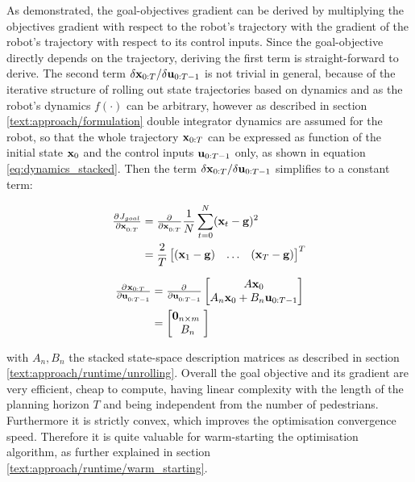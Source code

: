 As demonstrated, the goal-objectives gradient can be derived by multiplying the objectives gradient with respect to the robot's trajectory with the gradient of the robot's trajectory with respect to its control inputs. Since the goal-objective directly depends on the trajectory, deriving the first term is straight-forward to derive. The second term $\delta \mathbf{x}_{0:T} / \delta \mathbf{u}_{0:T-1}$ is not trivial in general, because of the iterative structure of rolling out state trajectories based on dynamics and as the robot's dynamics $f(\cdot)$ can be arbitrary, however as described in section \ref{text:approach/formulation} double integrator dynamics are assumed for the robot, so that the whole trajectory $\mathbf{x}_{0:T}$ can be expressed as function of the initial state $\mathbf{x}_0$ and the control inputs $\mathbf{u}_{0:T-1}$ only, as shown in equation \ref{eq:dynamics_stacked}. Then the term $\delta \mathbf{x}_{0:T} / \delta \mathbf{u}_{0:T-1}$ simplifies to a constant term:

\begin{align}
\pd{J_{goal}}{\x_{0:T}} &= \pd{}{\x_{0:T}} \frac{1}{N} \sum_{t = 0}^N (\x_t - \mathbf{g})^2 \\
&= \frac{2}{T} \begin{bmatrix} (\x_1 - \mathbf{g}) & \hdots & (\x_T - \mathbf{g}) \end{bmatrix}^T
\end{align}

\begin{align}
\pd{\x_{0:T}}{\u_{0:T-1}} &= \pd{}{\u_{0:T-1}} \begin{bmatrix} A \x_0 \\ A_n \x_0 + B_n \u_{0:T-1} \end{bmatrix} \\
&= \begin{bmatrix} \mathbf{0}_{n \times m} \\ B_n \end{bmatrix}
\end{align}

with $A_n, B_n$ the stacked state-space description matrices as described in section \ref{text:approach/runtime/unrolling}. 
\newline
Overall the goal objective and its gradient are very efficient, cheap to compute, having linear complexity with the length of the planning horizon $T$ and being independent from the number of pedestrians. Furthermore it is strictly convex, which improves the optimisation convergence speed. Therefore it is quite valuable for warm-starting the optimisation algorithm, as further explained in section \ref{text:approach/runtime/warm_starting}.


